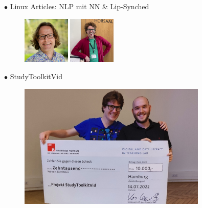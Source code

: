 \documentclass[aspectratio=169]{beamer}
\begin{document}
\begin{frame}[fragile]
    \begin{minipage}{.6\textwidth}
        {\color{thiscolor}$\bullet$} Linux Articles: NLP mit NN \citep{baumann2022NaturalLanguageProcessing} \& Lip-Synched \citep{baumann2023LipSynchedLinuxMagazine}
        \begin{figure}
        \centering
        \includegraphics[width=0.2\textwidth]{images/Timo_Baumann.jpg}
        \includegraphics[width=0.2\textwidth]{images/Christian_Schuler_Essv.jpg}
    \end{figure}
    \end{minipage}\hfill%
    \begin{minipage}{.35\textwidth}
        {\color{thiscolor}$\bullet$} StudyToolkitVid
        \begin{figure}
        \centering
        \includegraphics[width=0.8\textwidth]{images/proj-2022-ddlitlab-StudyToolkitVid-500x333.jpg} 
        \end{figure}
    \end{minipage}


\end{frame}
\end{document}
